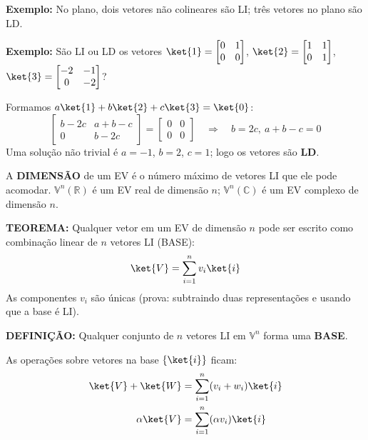{\bf Exemplo:} No plano, dois vetores não colineares são LI; três vetores no plano são LD.

{\bf Exemplo:} São LI ou LD os vetores
$\ket{1} = \begin{bmatrix} 0 & 1 \\ 0 & 0 \end{bmatrix}$,
$\ket{2} = \begin{bmatrix} 1 & 1 \\ 0 & 1 \end{bmatrix}$,
$\ket{3} = \begin{bmatrix} -2 & -1 \\ 0 & -2 \end{bmatrix}$?

Formamos $a\ket{1}+b\ket{2}+c\ket{3} = \ket{0}$:
\[
    \begin{bmatrix} b-2c & a+b-c \\ 0 & b-2c \end{bmatrix} = \begin{bmatrix} 0 & 0 \\ 0 & 0 \end{bmatrix}
    \quad \Longrightarrow \quad b = 2c,\ a+b-c = 0
\]
Uma solução não trivial é $a=-1$, $b=2$, $c=1$; logo os vetores são \textbf{LD}.

\begin{shadequote}
    A \textbf{DIMENSÃO} de um EV é o número máximo de vetores LI que ele pode acomodar. $\mathbb{V}^n(\mathbb{R})$ é um EV real de dimensão $n$; $\mathbb{V}^n(\mathbb{C})$ é um EV complexo de dimensão $n$.
\end{shadequote}

{\bf TEOREMA:} Qualquer vetor em um EV de dimensão $n$ pode ser escrito como combinação linear de $n$ vetores LI (BASE):
\begin{equation}
    \ket{V} = \sum_{i=1}^n v_i \ket{i}
\end{equation}
As componentes $v_i$ são únicas (prova: subtraindo duas representações e usando que a base é LI).

{\bf DEFINIÇÃO:} Qualquer conjunto de $n$ vetores LI em $\mathbb{V}^n$ forma uma \textbf{BASE}.

As operações sobre vetores na base $\{\ket{i}\}$ ficam:
\begin{align}
    \ket{V} + \ket{W} &= \sum_{i=1}^n (v_i + w_i)\ket{i} \\
    \alpha\ket{V} &= \sum_{i=1}^n (\alpha v_i)\ket{i}
\end{align}


